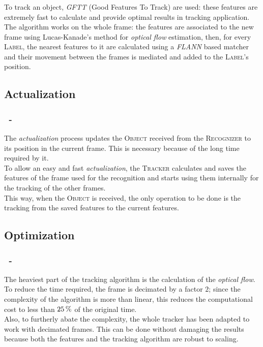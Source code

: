 \documentclass{beamer}
\begin{document}
  \begin{frame}
    \frametitle{\insertsection}
    To track an object, \emph{GFTT} (Good Features To Track) are used:
    these features are extremely fast to calculate and provide optimal results
    in tracking application.\\
    The algorithm works on the whole frame: the features are associated to the
    new frame using Lucas-Kanade's method for \emph{optical flow} estimation,
    then, for every \textsc{Label}, the nearest features to it are calculated
    using a \emph{FLANN} based matcher and their movement between the frames is
    mediated and added to the \textsc{Label}'s position.
  \end{frame}

  \subsection{Actualization}

  \begin{frame}
    \frametitle{\insertsection\ - \insertsubsection}
    The \emph{actualization} process updates the \textsc{Object} received from
    the \textsc{Recognizer} to its position in the current frame. This is
    necessary because of the long time required by it.\\
    To allow an easy and fast \emph{actualization}, the \textsc{Tracker}
    calculates and saves the features of the frame used for the recognition
    and starts using them internally for the tracking of the other frames.\\
    This way, when the \textsc{Object} is received, the only operation to be
    done is the tracking from the saved features to the current features.\\
  \end{frame}
  
  \subsection{Optimization}

  \begin{frame}
    \frametitle{\insertsection\ - \insertsubsection}
    The heaviest part of the tracking algorithm is the calculation of the
    \emph{optical flow}. To reduce the time required, the frame is
    decimated by a factor $2$; since the complexity of the algorithm is
    more than linear, this reduces the computational cost to less than
    $\unit[25]{\%}$ of the original time.\\
    Also, to furtherly abate the complexity, the whole tracker has been
    adapted to work with decimated frames. This can be done without damaging
    the results because both the features and the tracking algorithm are
    robust to scaling.\\
  \end{frame}
\end{document}
